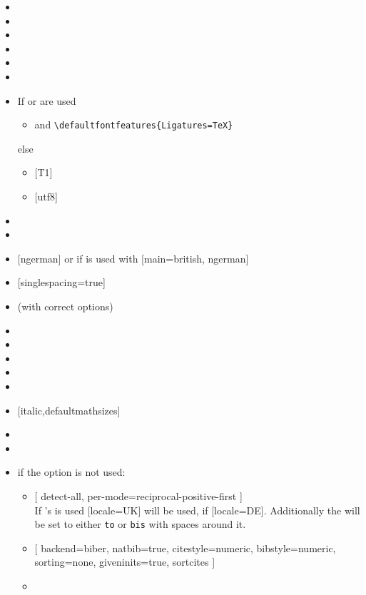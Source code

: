 \begin{multicols}{2}%
  \begin{itemize}[leftmargin=10pt]
    \item {}
    \item {}
    \item {}
    \item {}
    \item {}
    \item {}
    \item If  or  are used
      \begin{itemize}[topsep=0pt]
        \item {} and
          \verb|\defaultfontfeatures|\hskip0pt\verb|{Ligatures=TeX}|
      \end{itemize}
      else
      \begin{itemize}[topsep=0pt]
        \item {} [T1]
        \item {} [utf8]
      \end{itemize}
    \item {}
    \item {}
    \item {} [ngerman] or if  is used with
      [main=british, ngerman]
    \item {} [singlespacing=true]
    \item {} (with correct options)
    \item {}
    \item {}
    \item {}
    \item {}
    \item {}
    \item {} [italic,defaultmathsizes]
    \item {}
    \item {}
    \item if the  option is not used:
      \begin{itemize}
        \item {}
          [%
            detect-all,
            per-mode=reciprocal-positive-first%
          ]\\
          If 's  is used [locale=UK] will be used, if
           [locale=DE]. Additionally the  will be
          set to either \texttt{to} or \texttt{bis} with spaces around it.
        \item {}
          [%
            backend=biber, natbib=true, citestyle=numeric, bibstyle=numeric,
            sorting=none, giveninits=true, sortcites%
          ]
        \item {}
      \end{itemize}
  \end{itemize}
\end{multicols}%
